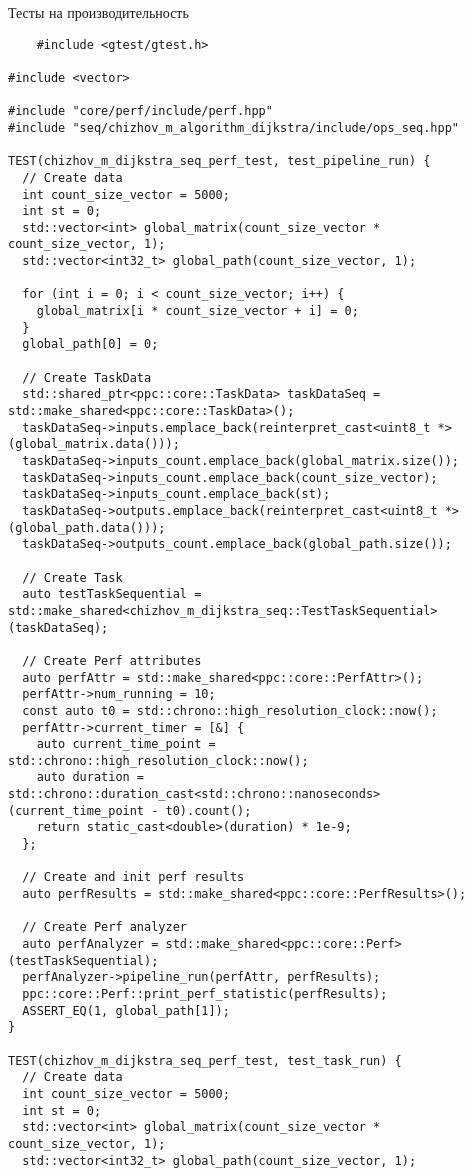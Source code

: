 \documentclass[a4paper, 14pt]{extarticle}
\begin{document}
Тесты на производительность\\

\begin{lstlisting}
    #include <gtest/gtest.h>

#include <vector>

#include "core/perf/include/perf.hpp"
#include "seq/chizhov_m_algorithm_dijkstra/include/ops_seq.hpp"

TEST(chizhov_m_dijkstra_seq_perf_test, test_pipeline_run) {
  // Create data
  int count_size_vector = 5000;
  int st = 0;
  std::vector<int> global_matrix(count_size_vector * count_size_vector, 1);
  std::vector<int32_t> global_path(count_size_vector, 1);

  for (int i = 0; i < count_size_vector; i++) {
    global_matrix[i * count_size_vector + i] = 0;
  }
  global_path[0] = 0;

  // Create TaskData
  std::shared_ptr<ppc::core::TaskData> taskDataSeq = std::make_shared<ppc::core::TaskData>();
  taskDataSeq->inputs.emplace_back(reinterpret_cast<uint8_t *>(global_matrix.data()));
  taskDataSeq->inputs_count.emplace_back(global_matrix.size());
  taskDataSeq->inputs_count.emplace_back(count_size_vector);
  taskDataSeq->inputs_count.emplace_back(st);
  taskDataSeq->outputs.emplace_back(reinterpret_cast<uint8_t *>(global_path.data()));
  taskDataSeq->outputs_count.emplace_back(global_path.size());

  // Create Task
  auto testTaskSequential = std::make_shared<chizhov_m_dijkstra_seq::TestTaskSequential>(taskDataSeq);

  // Create Perf attributes
  auto perfAttr = std::make_shared<ppc::core::PerfAttr>();
  perfAttr->num_running = 10;
  const auto t0 = std::chrono::high_resolution_clock::now();
  perfAttr->current_timer = [&] {
    auto current_time_point = std::chrono::high_resolution_clock::now();
    auto duration = std::chrono::duration_cast<std::chrono::nanoseconds>(current_time_point - t0).count();
    return static_cast<double>(duration) * 1e-9;
  };

  // Create and init perf results
  auto perfResults = std::make_shared<ppc::core::PerfResults>();

  // Create Perf analyzer
  auto perfAnalyzer = std::make_shared<ppc::core::Perf>(testTaskSequential);
  perfAnalyzer->pipeline_run(perfAttr, perfResults);
  ppc::core::Perf::print_perf_statistic(perfResults);
  ASSERT_EQ(1, global_path[1]);
}

TEST(chizhov_m_dijkstra_seq_perf_test, test_task_run) {
  // Create data
  int count_size_vector = 5000;
  int st = 0;
  std::vector<int> global_matrix(count_size_vector * count_size_vector, 1);
  std::vector<int32_t> global_path(count_size_vector, 1);


\end{lstlisting}
\end{document}

